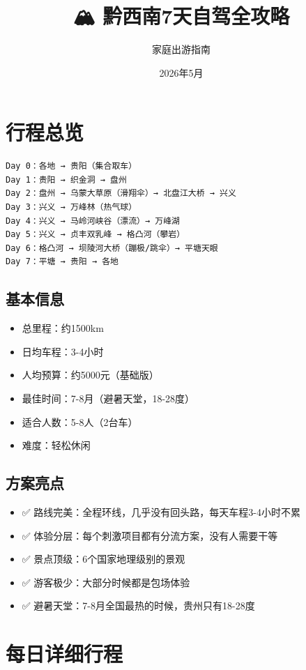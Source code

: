 \documentclass[12pt,a4paper,UTF8]{ctexart}
\title{\Huge \textbf{🏔️ 黔西南7天自驾全攻略}}
\author{家庭出游指南}
\date{2026年5月}
\begin{document}
\maketitle
\thispagestyle{empty}

\newpage
\tableofcontents
\newpage


\section{行程总览}

\begin{verbatim}
Day 0：各地 → 贵阳（集合取车）
Day 1：贵阳 → 织金洞 → 盘州
Day 2：盘州 → 乌蒙大草原（滑翔伞）→ 北盘江大桥 → 兴义
Day 3：兴义 → 万峰林（热气球）
Day 4：兴义 → 马岭河峡谷（漂流）→ 万峰湖
Day 5：兴义 → 贞丰双乳峰 → 格凸河（攀岩）
Day 6：格凸河 → 坝陵河大桥（蹦极/跳伞）→ 平塘天眼
Day 7：平塘 → 贵阳 → 各地
\end{verbatim}

\subsection{基本信息}
\begin{itemize}
\item 总里程：约1500km
\item 日均车程：3-4小时
\item 人均预算：约5000元（基础版）
\item 最佳时间：7-8月（避暑天堂，18-28度）
\item 适合人数：5-8人（2台车）
\item 难度：轻松休闲
\end{itemize}

\subsection{方案亮点}
\begin{itemize}
\item ✅ 路线完美：全程环线，几乎没有回头路，每天车程3-4小时不累
\item ✅ 体验分层：每个刺激项目都有分流方案，没有人需要干等
\item ✅ 景点顶级：6个国家地理级别的景观
\item ✅ 游客极少：大部分时候都是包场体验
\item ✅ 避暑天堂：7-8月全国最热的时候，贵州只有18-28度
\end{itemize}

\newpage

\section{每日详细行程}
\end{document}

